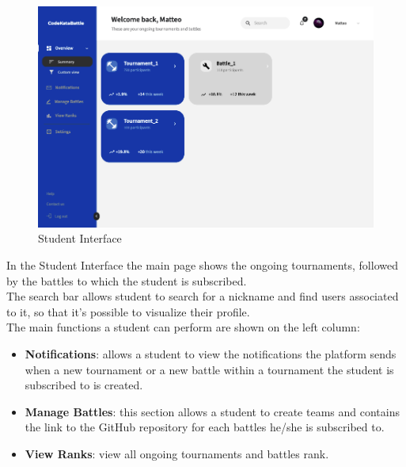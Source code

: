 \vspace{100pt}

\begin{figure}[H]
    \centering
    \includegraphics[scale=0.45]{src/student_view.png}
    \caption*{Student Interface}
\end{figure} \vspace{0.5cm}

In the Student Interface the main page shows the ongoing tournaments, followed by the battles to which the student is subscribed. \\The search bar allows student to search for a nickname and find users associated to it, so that it's possible to visualize their profile. \\The main functions a student can perform are shown on the left column:
\begin{itemize}
    \item \textbf{Notifications}: allows a student to view the notifications the platform sends when a new tournament or a new battle within a tournament the student is subscribed to is created.
    \item \textbf{Manage Battles}: this section allows a student to create teams and contains the link to the GitHub repository for each battles he/she is subscribed to. 
    \item \textbf{View Ranks}: view all ongoing tournaments and battles rank.
\end{itemize}
